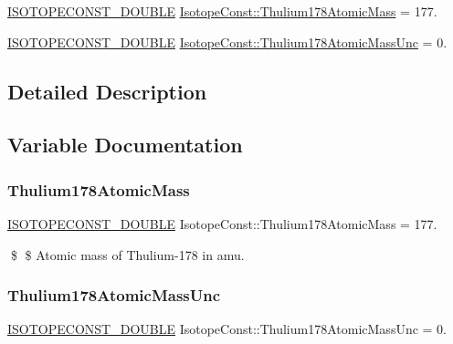 \begin{DoxyCompactItemize}
\item 
\mbox{\hyperlink{group___isotope_const-_macros_ga8f45a7272ce02c0b4c65c44636ed719a}{I\+S\+O\+T\+O\+P\+E\+C\+O\+N\+S\+T\+\_\+\+D\+O\+U\+B\+LE}} \mbox{\hyperlink{group___isotope_const-_thulium-_tm178_gaca6ff3c4d58b3533109f6ffc9bfda6f6}{Isotope\+Const\+::\+Thulium178\+Atomic\+Mass}} = 177.
\item 
\mbox{\hyperlink{group___isotope_const-_macros_ga8f45a7272ce02c0b4c65c44636ed719a}{I\+S\+O\+T\+O\+P\+E\+C\+O\+N\+S\+T\+\_\+\+D\+O\+U\+B\+LE}} \mbox{\hyperlink{group___isotope_const-_thulium-_tm178_gadc2d75df53e9cf823a02174fbfe9f5c5}{Isotope\+Const\+::\+Thulium178\+Atomic\+Mass\+Unc}} = 0.
\end{DoxyCompactItemize}


\subsection{Detailed Description}


\subsection{Variable Documentation}
\mbox{\label{group___isotope_const-_thulium-_tm178_gaca6ff3c4d58b3533109f6ffc9bfda6f6}} 
\subsubsection{\texorpdfstring{Thulium178\+Atomic\+Mass}{Thulium178AtomicMass}}
{\footnotesize\ttfamily \mbox{\hyperlink{group___isotope_const-_macros_ga8f45a7272ce02c0b4c65c44636ed719a}{I\+S\+O\+T\+O\+P\+E\+C\+O\+N\+S\+T\+\_\+\+D\+O\+U\+B\+LE}} Isotope\+Const\+::\+Thulium178\+Atomic\+Mass = 177.}

\$ \$ Atomic mass of Thulium-\/178 in amu. \mbox{\label{group___isotope_const-_thulium-_tm178_gadc2d75df53e9cf823a02174fbfe9f5c5}} 
\subsubsection{\texorpdfstring{Thulium178\+Atomic\+Mass\+Unc}{Thulium178AtomicMassUnc}}
{\footnotesize\ttfamily \mbox{\hyperlink{group___isotope_const-_macros_ga8f45a7272ce02c0b4c65c44636ed719a}{I\+S\+O\+T\+O\+P\+E\+C\+O\+N\+S\+T\+\_\+\+D\+O\+U\+B\+LE}} Isotope\+Const\+::\+Thulium178\+Atomic\+Mass\+Unc = 0.}

